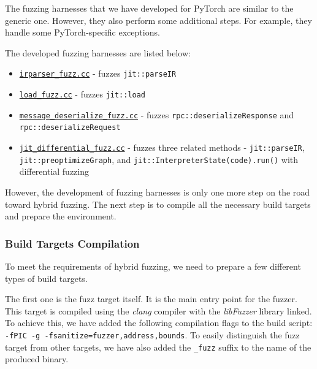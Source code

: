 The fuzzing harnesses that we have developed for PyTorch are similar to the generic one. However, they also perform some additional steps. For example, they handle some PyTorch-specific exceptions.

The developed fuzzing harnesses are listed below:

\begin{itemize}
    \item \href{https://github.com/ispras/oss-sydr-fuzz/blob/028e36875424aec00ef7375006c413a4be164197/projects/pytorch/irparser_fuzz.cc}{\texttt{irparser\_fuzz.cc}} - fuzzes \texttt{jit::parseIR}
    \item \href{https://github.com/ispras/oss-sydr-fuzz/blob/028e36875424aec00ef7375006c413a4be164197/projects/pytorch/load_fuzz.cc}{\texttt{load\_fuzz.cc}} - fuzzes \texttt{jit::load}
    \item \href{https://github.com/ispras/oss-sydr-fuzz/blob/028e36875424aec00ef7375006c413a4be164197/projects/pytorch/message_deserialize_fuzz.cc}{\texttt{message\_deserialize\_fuzz.cc}} - fuzzes \texttt{rpc::deserializeResponse} and \texttt{rpc::deserializeRequest}
    \item \href{https://github.com/ispras/oss-sydr-fuzz/blob/028e36875424aec00ef7375006c413a4be164197/projects/pytorch/jit_differential_fuzz.cc}{\texttt{jit\_differential\_fuzz.cc}} - fuzzes three related methods - \texttt{jit::parseIR}, \texttt{jit::preoptimizeGraph}, and \texttt{jit::InterpreterState(code).run()} with differential fuzzing
\end{itemize}

However, the development of fuzzing harnesses is only one more step on the road toward hybrid fuzzing. The next step is to compile all the necessary build targets and prepare the environment.

\subsubsection{Build Targets Compilation}

To meet the requirements of hybrid fuzzing, we need to prepare a few different types of build targets.


The first one is the fuzz target itself. It is the main entry point for the fuzzer. This target is compiled using the \textit{clang} compiler with the \textit{libFuzzer} library linked. To achieve this, we have added the following compilation flags to the build script: \texttt{-fPIC -g -fsanitize=fuzzer,address,bounds}. To easily distinguish the fuzz target from other targets, we have also added the \texttt{\_fuzz} suffix to the name of the produced binary.

